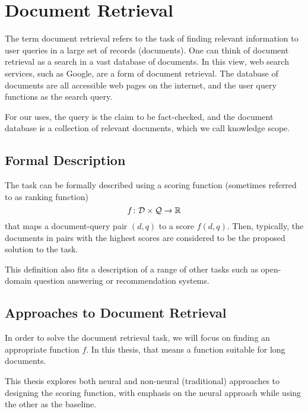 \chapter{Document Retrieval}
\label{chap:docret}

The term document retrieval refers to the task of finding relevant information to user queries in a large set of records (documents). 
One can think of document retrieval as a search in a vast database of documents. 
In this view, web search services, such as Google, are a form of document retrieval. The database of documents are all accessible web pages on the internet, and the user query functions as the search query.

For our uses, the query is the claim to be fact-checked, and the document database is a collection of relevant documents, which we call knowledge scope. 

\section{Formal Description}
The task can be formally described \citep{two-tower} using a scoring function (sometimes referred to as ranking function) %
$$f\colon\mathcal{D}\times\mathcal{Q}\rightarrow\mathbb{R}$$
that maps a document-query pair $(d, q)$ to a score $f(d,q)$. 
Then, typically, the documents in pairs with the highest scores are considered to be the proposed solution to the task. 

This definition also fits a description of a range of other tasks such as open-domain question answering \citep{wiki-retrieval} or recommendation systems.

\section{Approaches to Document Retrieval}
In order to solve the document retrieval task, we will focus on finding an appropriate function $f$.
In this thesis, that means a function suitable for long documents.

This thesis explores both neural and non-neural (traditional) approaches to designing the scoring function, with emphasis on the neural approach while using the other as the baseline.


